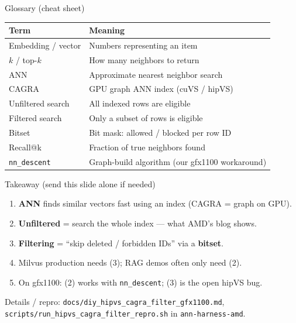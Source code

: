\documentclass[aspectratio=169,11pt]{beamer}
\begin{document}
\begin{frame}{Glossary (cheat sheet)}
  \footnotesize
  \begin{tabular}{@{}p{3.2cm}p{10cm}@{}}
    \toprule
    Term & Meaning \\
    \midrule
    Embedding / vector & Numbers representing an item \\
    $k$ / top-$k$ & How many neighbors to return \\
    ANN & Approximate nearest neighbor search \\
    CAGRA & GPU graph ANN index (cuVS / hipVS) \\
    Unfiltered search & All indexed rows are eligible \\
    Filtered search & Only a subset of rows is eligible \\
    Bitset & Bit mask: allowed / blocked per row ID \\
    Recall@k & Fraction of true neighbors found \\
    \texttt{nn\_descent} & Graph-build algorithm (our gfx1100 workaround) \\
    \bottomrule
  \end{tabular}
\end{frame}

\begin{frame}{Takeaway (send this slide alone if needed)}
  \begin{enumerate}
    \item \textbf{ANN} finds similar vectors fast using an index (CAGRA = graph on GPU).
    \item \textbf{Unfiltered} = search the whole index --- what AMD's blog shows.
    \item \textbf{Filtering} = ``skip deleted / forbidden IDs'' via a \textbf{bitset}.
    \item Milvus production needs (3); RAG demos often only need (2).
    \item On gfx1100: (2) works with \texttt{nn\_descent}; (3) is the open hipVS bug.
  \end{enumerate}

  \vspace{0.6em}
  {\footnotesize Details / repro: \texttt{docs/diy\_hipvs\_cagra\_filter\_gfx1100.md},\\
  \texttt{scripts/run\_hipvs\_cagra\_filter\_repro.sh} in \texttt{ann-harness-amd}.}
\end{frame}
\end{document}
